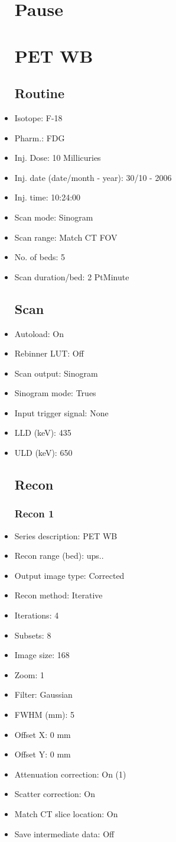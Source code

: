 \documentclass[12pt]{article}
\begin{document}
\begin{itemize}
\section{Pause}

\section{PET WB}
\subsection{Routine}
\item Isotope: F-18
\item Pharm.: FDG
\item Inj. Dose: 10 Millicuries
\item Inj. date (date/month - year): 30/10 - 2006
\item Inj. time: 10:24:00
\item Scan mode: Sinogram
\item Scan range: Match CT FOV
\item No. of beds: 5
\item Scan duration/bed: 2 PtMinute
\subsection{Scan}
\item Autoload: On
\item Rebinner LUT: Off
\item Scan output: Sinogram
\item Sinogram mode: Trues
\item Input trigger signal: None
\item LLD (keV): 435
\item ULD (keV): 650
\subsection{Recon}

\subsubsection{Recon 1}
\item Series description: PET WB 
\item Recon range (bed): ups..
\item Output image type: Corrected
\item Recon method: Iterative
\item Iterations: 4
\item Subsets: 8
\item Image size: 168
\item Zoom: 1
\item Filter: Gaussian
\item FWHM (mm): 5
\item Offset X: 0 mm
\item Offset Y: 0 mm
\item Attenuation correction: On (1)
\item Scatter correction: On
\item Match CT slice location: On
\item Save intermediate data: Off

\end{itemize}
\end{document}
